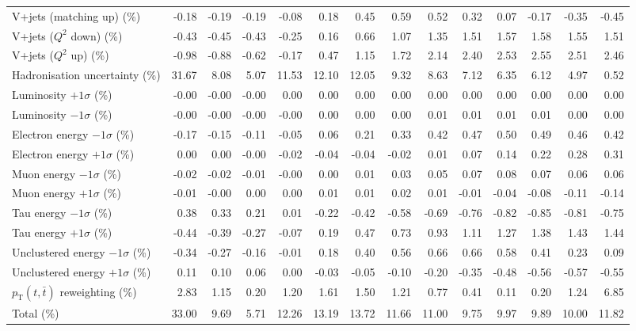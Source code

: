 \begin{table}[htbp]
{\begin{tabular}{lrrrrrrrrrrrrr}
V+jets (matching up) (\%) & -0.18 & -0.19 & -0.19 & -0.08 & 0.18 & 0.45 & 0.59 & 0.52 & 0.32 & 0.07 & -0.17 & -0.35 & -0.45 \\ 
V+jets ($Q^{2}$ down) (\%) & -0.43 & -0.45 & -0.43 & -0.25 & 0.16 & 0.66 & 1.07 & 1.35 & 1.51 & 1.57 & 1.58 & 1.55 & 1.51 \\ 
V+jets ($Q^{2}$ up) (\%) & -0.98 & -0.88 & -0.62 & -0.17 & 0.47 & 1.15 & 1.72 & 2.14 & 2.40 & 2.53 & 2.55 & 2.51 & 2.46 \\ 
Hadronisation uncertainty (\%) & 31.67 & 8.08 & 5.07 & 11.53 & 12.10 & 12.05 & 9.32 & 8.63 & 7.12 & 6.35 & 6.12 & 4.97 & 0.52 \\ 
Luminosity $+1\sigma$ (\%) & -0.00 & -0.00 & -0.00 & 0.00 & 0.00 & 0.00 & 0.00 & 0.00 & 0.00 & 0.00 & 0.00 & 0.00 & 0.00 \\ 
Luminosity $-1\sigma$ (\%) & -0.00 & -0.00 & -0.00 & -0.00 & 0.00 & 0.00 & 0.00 & 0.01 & 0.01 & 0.01 & 0.01 & 0.00 & 0.00 \\ 
Electron energy $-1\sigma$ (\%) & -0.17 & -0.15 & -0.11 & -0.05 & 0.06 & 0.21 & 0.33 & 0.42 & 0.47 & 0.50 & 0.49 & 0.46 & 0.42 \\ 
Electron energy $+1\sigma$ (\%) & 0.00 & 0.00 & -0.00 & -0.02 & -0.04 & -0.04 & -0.02 & 0.01 & 0.07 & 0.14 & 0.22 & 0.28 & 0.31 \\ 
Muon energy $-1\sigma$ (\%) & -0.02 & -0.02 & -0.01 & -0.00 & 0.00 & 0.01 & 0.03 & 0.05 & 0.07 & 0.08 & 0.07 & 0.06 & 0.06 \\ 
Muon energy $+1\sigma$ (\%) & -0.01 & -0.00 & 0.00 & 0.00 & 0.01 & 0.01 & 0.02 & 0.01 & -0.01 & -0.04 & -0.08 & -0.11 & -0.14 \\ 
Tau energy $-1\sigma$ (\%) & 0.38 & 0.33 & 0.21 & 0.01 & -0.22 & -0.42 & -0.58 & -0.69 & -0.76 & -0.82 & -0.85 & -0.81 & -0.75 \\ 
Tau energy $+1\sigma$ (\%) & -0.44 & -0.39 & -0.27 & -0.07 & 0.19 & 0.47 & 0.73 & 0.93 & 1.11 & 1.27 & 1.38 & 1.43 & 1.44 \\ 
Unclustered energy $-1\sigma$ (\%) & -0.34 & -0.27 & -0.16 & -0.01 & 0.18 & 0.40 & 0.56 & 0.66 & 0.66 & 0.58 & 0.41 & 0.23 & 0.09 \\ 
Unclustered energy $+1\sigma$ (\%) & 0.11 & 0.10 & 0.06 & 0.00 & -0.03 & -0.05 & -0.10 & -0.20 & -0.35 & -0.48 & -0.56 & -0.57 & -0.55 \\ 
$p_\mathrm{T}(t,\bar{t})$ reweighting (\%) & 2.83 & 1.15 & 0.20 & 1.20 & 1.61 & 1.50 & 1.21 & 0.77 & 0.41 & 0.11 & 0.20 & 1.24 & 6.85 \\ 
\hline 
Total (\%) & 33.00  & 9.69  & 5.71  & 12.26  & 13.19  & 13.72  & 11.66  & 11.00  & 9.75  & 9.97  & 9.89  & 10.00  & 11.82 \\ 
\hline 
\end{tabular}
}
\end{table}
